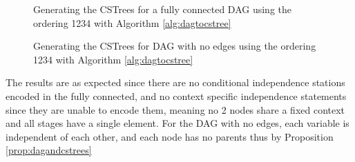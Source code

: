 \documentclass{tufte-book}
\begin{document}
\begin{figure}[!h]\label{fig:dagtocstree_cstree}
   \begin{floatrow}
%
\caption{Generating the CSTrees for a fully connected DAG using the ordering 1234 with Algorithm \ref{alg:dagtocstree}}
        
   \end{floatrow}
\end{figure}

\begin{figure}[!h]\label{fig:dagtocstree_cstree}
   \begin{floatrow}
%
\caption{Generating the CSTrees for DAG with no edges using the ordering 1234 with Algorithm \ref{alg:dagtocstree}}
        
   \end{floatrow}
\end{figure}

The results are as expected since there are no conditional independence stations encoded in the fully connected, and no context specific independence statements since they are unable to encode them, meaning no 2 nodes share a fixed context and all stages have a single element. For the DAG with no edges, each variable is independent of each other, and each node has no parents thus by Proposition \ref{prop:dagandcstrees}
\end{document}

